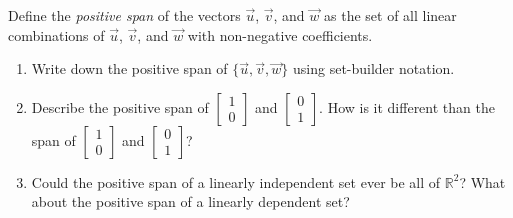 \documentclass[red]{tutorial}
\newcommand{\R}{\mathbb{R}}
\newcommand{\mat}[1]{\begin{bmatrix}#1\end{bmatrix}}
\theoremstyle{definition}
\theoremstyle{theorem}
\begin{document}
\begin{tutorial}
\begin{enumerate}
		Define the \emph{positive span} of the vectors $\vec u$, $\vec v$, and $\vec w$ as the set of all
		linear combinations of $\vec u$, $\vec v$, and $\vec w$ with non-negative coefficients.

		\begin{enumerate}
			\item Write down the positive span of $\{\vec u,\vec v,\vec w\}$ using set-builder notation.
			\item Describe the positive span of $\mat{1\\0}$ and $\mat{0\\1}$. How is it different than
				the span of $\mat{1\\0}$ and $\mat{0\\1}$?
			\item Could the positive span of a linearly independent set ever be all of $\R^2$? What about the
				positive span of a linearly dependent set?
		\end{enumerate}
	
\end{enumerate}
	\end{tutorial}
\end{document}
